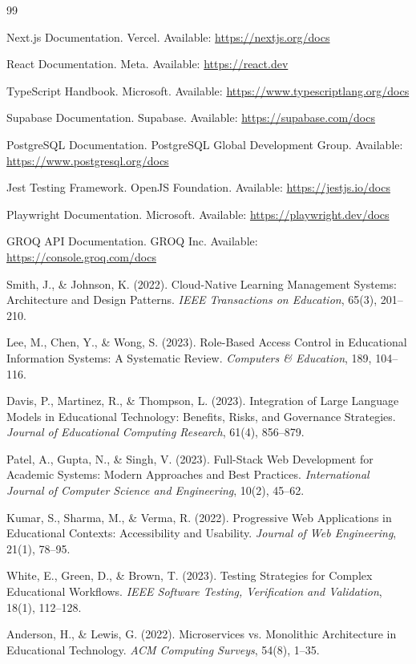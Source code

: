 \documentclass[11pt,a4paper]{article}
\begin{document}
\begin{thebibliography}{99}

 Next.js Documentation. Vercel. Available: \url{https://nextjs.org/docs}

 React Documentation. Meta. Available: \url{https://react.dev}

 TypeScript Handbook. Microsoft. Available: \url{https://www.typescriptlang.org/docs}

 Supabase Documentation. Supabase. Available: \url{https://supabase.com/docs}

 PostgreSQL Documentation. PostgreSQL Global Development Group. Available: \url{https://www.postgresql.org/docs}

 Jest Testing Framework. OpenJS Foundation. Available: \url{https://jestjs.io/docs}

 Playwright Documentation. Microsoft. Available: \url{https://playwright.dev/docs}

 GROQ API Documentation. GROQ Inc. Available: \url{https://console.groq.com/docs}

 Smith, J., \& Johnson, K. (2022). Cloud-Native Learning Management Systems: Architecture and Design Patterns. \textit{IEEE Transactions on Education}, 65(3), 201--210.

 Lee, M., Chen, Y., \& Wong, S. (2023). Role-Based Access Control in Educational Information Systems: A Systematic Review. \textit{Computers \& Education}, 189, 104--116.

 Davis, P., Martinez, R., \& Thompson, L. (2023). Integration of Large Language Models in Educational Technology: Benefits, Risks, and Governance Strategies. \textit{Journal of Educational Computing Research}, 61(4), 856--879.

 Patel, A., Gupta, N., \& Singh, V. (2023). Full-Stack Web Development for Academic Systems: Modern Approaches and Best Practices. \textit{International Journal of Computer Science and Engineering}, 10(2), 45--62.

 Kumar, S., Sharma, M., \& Verma, R. (2022). Progressive Web Applications in Educational Contexts: Accessibility and Usability. \textit{Journal of Web Engineering}, 21(1), 78--95.

 White, E., Green, D., \& Brown, T. (2023). Testing Strategies for Complex Educational Workflows. \textit{IEEE Software Testing, Verification and Validation}, 18(1), 112--128.

 Anderson, H., \& Lewis, G. (2022). Microservices vs. Monolithic Architecture in Educational Technology. \textit{ACM Computing Surveys}, 54(8), 1--35.

\end{thebibliography}
\end{document}

